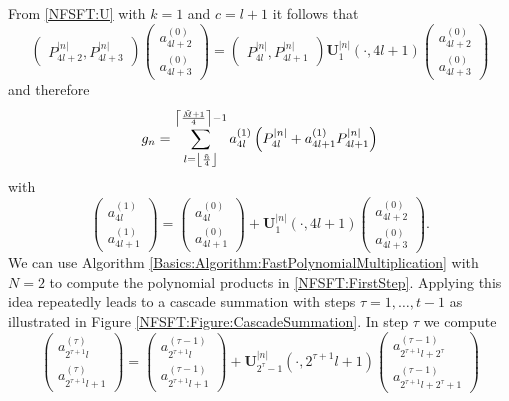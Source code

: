 From \eqref{NFSFT:U} with $k = 1$ and $c = l+1$ it follows that
$$
\left(\begin{array}{c}
  P_{4l+2}^{|n|}, 
  P_{4l+3}^{|n|}
\end{array}\right)
\left(\begin{array}{c}
  a_{4l+2}^{(0)}\\
  a_{4l+3}^{(0)} 
\end{array}\right)
=
\left(\begin{array}{c}
  P_{4l}^{|n|},
  P_{4l+1}^{|n|}
\end{array}\right)
{\mathbf{U}_{1}^{|n|}\left(\cdot,4l+1\right)}
\left(\begin{array}{c}
  a_{4l+2}^{(0)}\\
  a_{4l+3}^{(0)} 
\end{array}\right)
$$
and therefore
$$ g_n = \sum_{l = \left\lfloor\frac{\tilde{n}}{4}\right\rfloor}^{\left\lceil\frac{\tilde{M}+1}{4}\right\rceil-1} a_{4l}^{(1)} \left(P_{4l}^{\left\vert n\right\vert} + a_{4l+1}^{(1)} P_{4l+1}^{\left\vert n\right\vert}\right) $$
with
\begin{equation}
\label{NFSFT:FirstStep}
  \left(\begin{array}{c}
    a_{4l}^{(1)}\\
    a_{4l+1}^{(1)} 
  \end{array}\right)
  =
  \left(\begin{array}{c}
    a_{4l}^{(0)}\\
    a_{4l+1}^{(0)} 
  \end{array}\right)
  + {\mathbf{U}_{1}^{|n|}\left(\cdot,4l+1\right)}
  \left(\begin{array}{c}
    a_{4l+2}^{(0)}\\
    a_{4l+3}^{(0)} 
  \end{array}\right).
\end{equation}
We can use Algorithm \ref{Basics:Algorithm:FastPolynomialMultiplication} with $N=2$ to compute 
the polynomial products in \eqref{NFSFT:FirstStep}. Applying this idea repeatedly leads to a cascade 
summation with steps $\tau=1,\ldots,t-1$ as illustrated in Figure \ref{NFSFT:Figure:CascadeSummation}. 
In step $\tau$ we compute
\begin{equation}
  \label{NFSFT:GeneralStep}
  \left(\begin{array}{c}
    a_{2^{\tau+1}l}^{(\tau)}\\
    a_{2^{\tau+1}l+1}^{(\tau)} 
  \end{array}\right)
  =
  \left(\begin{array}{c}
    a_{2^{\tau+1}l}^{(\tau-1)}\\
    a_{2^{\tau+1}l+1}^{(\tau-1)} 
  \end{array}\right)
  + {\mathbf{U}_{2^{\tau}-1}^{|n|}\left(\cdot,2^{\tau+1}l+1\right)}
  \left(\begin{array}{c}
    a_{2^{\tau+1}l+2^{\tau}}^{(\tau-1)}\\
    a_{2^{\tau+1}l+2^{\tau}+1}^{(\tau-1)} 
  \end{array}\right)
\end{equation}
